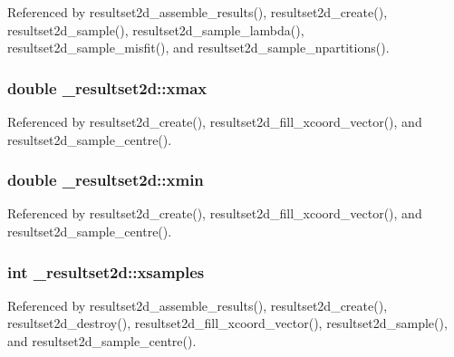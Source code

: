 Referenced by resultset2d\+\_\+assemble\+\_\+results(), resultset2d\+\_\+create(), resultset2d\+\_\+sample(), resultset2d\+\_\+sample\+\_\+lambda(), resultset2d\+\_\+sample\+\_\+misfit(), and resultset2d\+\_\+sample\+\_\+npartitions().

\subsubsection[{\texorpdfstring{xmax}{xmax}}]{\setlength{\rightskip}{0pt plus 5cm}double \+\_\+resultset2d\+::xmax}\hypertarget{struct__resultset2d_a0eb234ad987c834ab45b50d881ff688f}{}\label{struct__resultset2d_a0eb234ad987c834ab45b50d881ff688f}


Referenced by resultset2d\+\_\+create(), resultset2d\+\_\+fill\+\_\+xcoord\+\_\+vector(), and resultset2d\+\_\+sample\+\_\+centre().

\subsubsection[{\texorpdfstring{xmin}{xmin}}]{\setlength{\rightskip}{0pt plus 5cm}double \+\_\+resultset2d\+::xmin}\hypertarget{struct__resultset2d_af3147bc5fd1e8e27fdcf25de615101a3}{}\label{struct__resultset2d_af3147bc5fd1e8e27fdcf25de615101a3}


Referenced by resultset2d\+\_\+create(), resultset2d\+\_\+fill\+\_\+xcoord\+\_\+vector(), and resultset2d\+\_\+sample\+\_\+centre().

\subsubsection[{\texorpdfstring{xsamples}{xsamples}}]{\setlength{\rightskip}{0pt plus 5cm}int \+\_\+resultset2d\+::xsamples}\hypertarget{struct__resultset2d_a46cff8f7cf1d4a0908307bf499551dab}{}\label{struct__resultset2d_a46cff8f7cf1d4a0908307bf499551dab}


Referenced by resultset2d\+\_\+assemble\+\_\+results(), resultset2d\+\_\+create(), resultset2d\+\_\+destroy(), resultset2d\+\_\+fill\+\_\+xcoord\+\_\+vector(), resultset2d\+\_\+sample(), and resultset2d\+\_\+sample\+\_\+centre().

